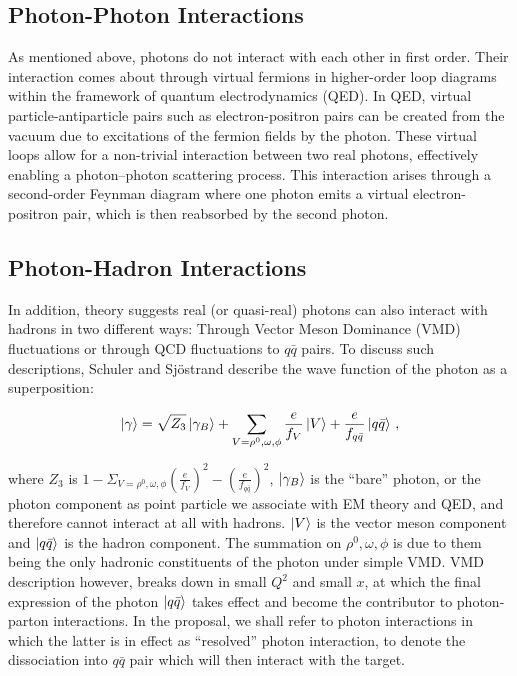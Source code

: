 \subsection{Photon-Photon Interactions}
As mentioned above, photons do not interact with each other in first order. Their interaction comes about through virtual fermions in higher-order loop diagrams within the framework of quantum electrodynamics (QED). In QED, virtual particle-antiparticle pairs such as electron-positron pairs can be created from the vacuum due to excitations of the fermion fields by the photon. These virtual loops allow for a non-trivial interaction between two real photons, effectively enabling a photon–photon scattering process. This interaction arises through a second-order Feynman diagram where one photon emits a virtual electron-positron pair, which is then reabsorbed by the second photon.


\subsection{Photon-Hadron Interactions}
In addition, theory suggests real (or quasi-real) photons can also interact with hadrons in two different ways: Through Vector Meson Dominance (VMD) fluctuations or through QCD fluctuations to $q\bar{q}$ pairs. To discuss such descriptions, Schuler and Sjöstrand \cite{schuler_towards_1993} describe the wave function of the photon as a superposition:

\begin{equation}\label{eq:photon_wavefunction}
	\ket{\gamma} = \sqrt{Z_3}\ket{\gamma_{B}} + \sum\limits_{V=\rho^0,\omega,\phi}\frac{e}{f_{V}}\ket{V} + \frac{e}{f_{q\bar{q}}}\ket{q\bar{q}} \,,
\end{equation}

where $Z_3$ is $1-\Sigma_{V=\rho^0,\omega,\phi}\left(\frac{e}{f_{V}}\right)^2 - \left(\frac{e}{f_{q\bar{q}}}\right)^2$, $\ket{\gamma_B}$ is the ``bare'' photon, or the photon component as point particle we associate with EM theory and QED, and therefore cannot interact at all with hadrons. $\ket{V}$ is the vector meson component and $\ket{q\bar{q}}$ is the hadron component. The summation on $\rho^0,\omega,\phi$ is due to them being the only hadronic constituents of the photon under simple VMD. VMD description however, breaks down in small $Q^2$ and small $x$, at which the final expression of the photon $\ket{q\bar{q}}$ takes effect and become the contributor to photon-parton interactions. In the proposal, we shall refer to photon interactions in which the latter is in effect as ``resolved'' photon interaction, to denote the dissociation into $q\bar{q}$ pair which will then interact with the target.


